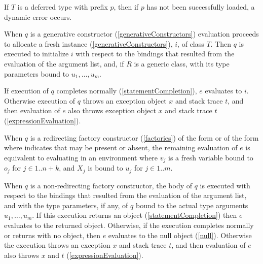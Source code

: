 \documentclass[makeidx]{article}
\begin{document}
{\LMHash{}%
If $T$ is a deferred type with prefix $p$,
then if $p$ has not been successfully loaded,
a dynamic error occurs.
\EndCase

\LMHash{}%
When $q$ is a generative constructor
(\ref{generativeConstructors})
evaluation proceeds to allocate a fresh instance
(\ref{generativeConstructors}), $i$, of class $T$.
Then $q$ is executed to initialize $i$ with respect to
the bindings that resulted from the evaluation of the argument list, and,
if $R$ is a generic class,
with its type parameters bound to $u_1, \ldots, u_m$.

\LMHash{}%
If execution of $q$ completes normally (\ref{statementCompletion}),
$e$ evaluates to $i$.
Otherwise execution of $q$ throws an exception object $x$ and stack trace $t$,
and then evaluation of $e$ also throws exception object $x$ and stack trace $t$
(\ref{expressionEvaluation}).
\EndCase

\LMHash{}%
When $q$ is a redirecting factory constructor
(\ref{factories})
of the form  or
of the form 
where  indicates that \CONST{} may be present or absent,
the remaining evaluation of $e$ is equivalent to
evaluating
in an environment where
$v_j$ is a fresh variable bound to $o_j$ for $j \in 1 .. n + k$, and
$X_j$ is bound to $u_j$ for $j \in 1 .. m$.
\EndCase

\LMHash{}%
When $q$ is a non-redirecting factory constructor,
the body of $q$ is executed with respect to
the bindings that resulted from the evaluation of the argument list,
and with the type parameters, if any, of $q$ bound to
the actual type arguments $u_1, \ldots, u_m$.
If this execution returns an object
(\ref{statementCompletion})
then $e$ evaluates to the returned object.
Otherwise, if the execution completes normally or returns with no object,
then $e$ evaluates to the null object (\ref{null}).
Otherwise the execution throws an exception $x$ and stack trace $t$,
and then evaluation of $e$ also throws $x$ and $t$
(\ref{expressionEvaluation}).

}
\end{document}
